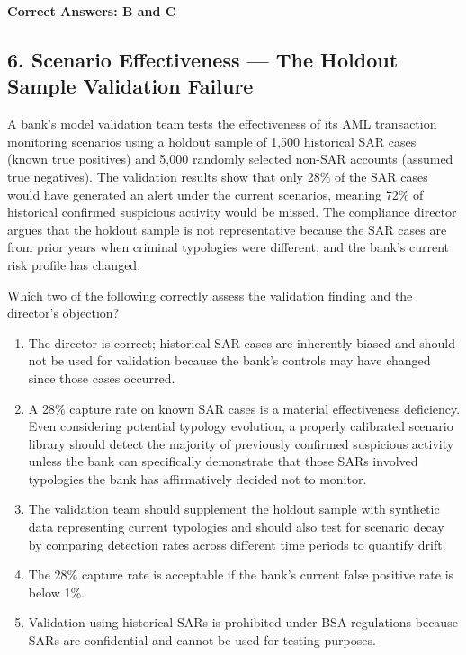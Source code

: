 \documentclass[11pt,a4paper]{article}
\begin{document}
	\textbf{Correct Answers: B and C}
	
	\subsection{6. Scenario Effectiveness — The Holdout Sample Validation Failure}
	
	A bank's model validation team tests the effectiveness of its AML transaction monitoring scenarios using a holdout sample of 1,500 historical SAR cases (known true positives) and 5,000 randomly selected non-SAR accounts (assumed true negatives). The validation results show that only 28\% of the SAR cases would have generated an alert under the current scenarios, meaning 72\% of historical confirmed suspicious activity would be missed. The compliance director argues that the holdout sample is not representative because the SAR cases are from prior years when criminal typologies were different, and the bank's current risk profile has changed.
	
	Which two of the following correctly assess the validation finding and the director's objection?
	
	\begin{enumerate}[label=\Alph*.]
		\item The director is correct; historical SAR cases are inherently biased and should not be used for validation because the bank's controls may have changed since those cases occurred.
		\item A 28\% capture rate on known SAR cases is a material effectiveness deficiency. Even considering potential typology evolution, a properly calibrated scenario library should detect the majority of previously confirmed suspicious activity unless the bank can specifically demonstrate that those SARs involved typologies the bank has affirmatively decided not to monitor.
		\item The validation team should supplement the holdout sample with synthetic data representing current typologies and should also test for scenario decay by comparing detection rates across different time periods to quantify drift.
		\item The 28\% capture rate is acceptable if the bank's current false positive rate is below 1\%.
		\item Validation using historical SARs is prohibited under BSA regulations because SARs are confidential and cannot be used for testing purposes.
	\end{enumerate}
	
\end{document}

